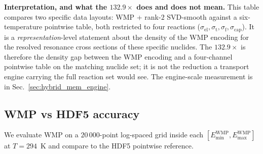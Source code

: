 \textbf{Interpretation, and what the $132.9\times$ does and
does not mean.} This table compares two specific data layouts:
WMP + rank-$2$ SVD-smooth against a six-temperature pointwise
table, both restricted to four reactions
($\sigma_\text{el}, \sigma_\text{t}, \sigma_\text{f},
\sigma_\text{cap}$). It is a \emph{representation}-level
statement about the density of the WMP encoding for the
resolved resonance cross sections of these specific nuclides.
The $132.9\times$ is therefore the density gap between the
WMP encoding and a four-channel pointwise table on the
matching nuclide set; it is not the reduction a transport
engine carrying the full reaction set would see. The
engine-scale measurement is in
Sec.~\ref{sec:hybrid_mem_engine}.

\subsection{WMP vs HDF5 accuracy}
\label{sec:hybrid_acc}

We evaluate WMP on a $20\,000$-point log-spaced grid inside
each $[E_\text{min}^\text{WMP}, E_\text{max}^\text{WMP}]$ at
$T = 294$~K and compare to the HDF5 pointwise reference.

